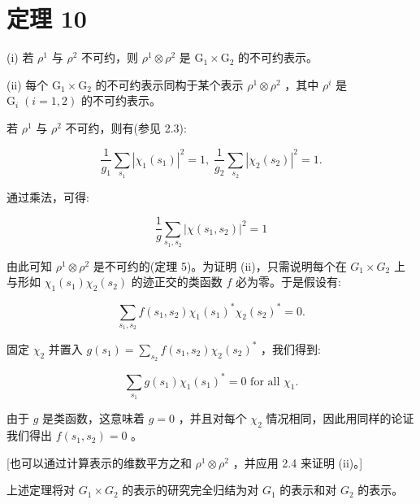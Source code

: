 \documentclass[10pt]{article}
\begin{document}
\section*{定理 10}

(i) 若 \({\rho }^{1}\) 与 \({\rho }^{2}\) 不可约，则 \({\rho }^{1} \otimes  {\rho }^{2}\) 是 \({\mathrm{G}}_{1} \times  {\mathrm{G}}_{2}\) 的不可约表示。

(ii) 每个 \({\mathrm{G}}_{1} \times  {\mathrm{G}}_{2}\) 的不可约表示同构于某个表示 \({\rho }^{1} \otimes  {\rho }^{2}\) ，其中 \({\rho }^{i}\) 是 \({\mathrm{G}}_{i} \; \left( {i = 1,2}\right)\) 的不可约表示。

若 \({\rho }^{1}\) 与 \({\rho }^{2}\) 不可约，则有(参见 2.3):

\[
\frac{1}{{g}_{1}}\mathop{\sum }\limits_{{s}_{1}}{\left| {\chi }_{1}\left( {s}_{1}\right) \right| }^{2} = 1,\;\frac{1}{{g}_{2}}\mathop{\sum }\limits_{{s}_{2}}{\left| {\chi }_{2}\left( {s}_{2}\right) \right| }^{2} = 1.
\]

通过乘法，可得:

\[
\frac{1}{g}\mathop{\sum }\limits_{{{s}_{1},{s}_{2}}}{\left| \chi \left( {s}_{1},{s}_{2}\right) \right| }^{2} = 1
\]

由此可知 \({\rho }^{1} \otimes  {\rho }^{2}\) 是不可约的(定理 5)。为证明 (ii)，只需说明每个在 \({G}_{1} \times  {G}_{2}\) 上与形如 \({\chi }_{1}\left( {s}_{1}\right) {\chi }_{2}\left( {s}_{2}\right)\) 的迹正交的类函数 \(f\) 必为零。于是假设有:

\[
\mathop{\sum }\limits_{{{s}_{1},{s}_{2}}}f\left( {{s}_{1},{s}_{2}}\right) {\chi }_{1}{\left( {s}_{1}\right) }^{ * }{\chi }_{2}{\left( {s}_{2}\right) }^{ * } = 0.
\]

固定 \({\chi }_{2}\) 并置入 \(g\left( {s}_{1}\right)  = \mathop{\sum }\limits_{{s}_{2}}f\left( {{s}_{1},{s}_{2}}\right) {\chi }_{2}{\left( {s}_{2}\right) }^{ * }\) ，我们得到:

\[
\mathop{\sum }\limits_{{s}_{1}}g\left( {s}_{1}\right) {\chi }_{1}{\left( {s}_{1}\right) }^{ * } = 0\text{ for all }{\chi }_{1}.
\]

由于 \(g\) 是类函数，这意味着 \(g = 0\) ，并且对每个 \({\chi }_{2}\) 情况相同，因此用同样的论证我们得出 \(f\left( {{s}_{1},{s}_{2}}\right)  = 0\) 。

[也可以通过计算表示的维数平方之和 \({\rho }^{1} \otimes  {\rho }^{2}\) ，并应用 2.4 来证明 (ii)。]

上述定理将对 \({G}_{1} \times  {G}_{2}\) 的表示的研究完全归结为对 \({G}_{1}\) 的表示和对 \({G}_{2}\) 的表示。
\end{document}
